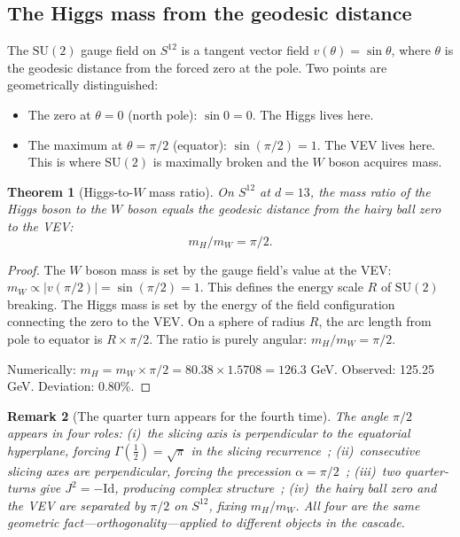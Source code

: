 \documentclass[12pt,a4paper]{article}
\newtheorem{theorem}{Theorem}[section]
\newtheorem{remark}[theorem]{Remark}
\begin{document}
\subsection{The Higgs mass from the geodesic distance}

The $\mathrm{SU}(2)$ gauge field on $S^{12}$ is a tangent vector field $v(\theta)=\sin\theta$,
where $\theta$ is the geodesic distance from the forced zero at the pole. Two points are
geometrically distinguished:
\begin{itemize}
\item The zero at $\theta=0$ (north pole): $\sin 0=0$. The Higgs lives here.
\item The maximum at $\theta=\pi/2$ (equator): $\sin(\pi/2)=1$. The VEV lives here. This
is where $\mathrm{SU}(2)$ is maximally broken and the $W$ boson acquires mass.
\end{itemize}

\begin{theorem}[Higgs-to-$W$ mass ratio]\label{thm:higgs}
On $S^{12}$ at $d=13$, the mass ratio of the Higgs boson to the $W$ boson equals the
geodesic distance from the hairy ball zero to the VEV:
\[
m_H/m_W = \pi/2.
\]
\end{theorem}
\begin{proof}
The $W$ boson mass is set by the gauge field's value at the VEV:
$m_W\propto|v(\pi/2)|=\sin(\pi/2)=1$. This defines the energy scale $R$ of $\mathrm{SU}(2)$
breaking. The Higgs mass is set by the energy of the field configuration connecting the zero
to the VEV. On a sphere of radius $R$, the arc length from pole to equator is $R\times\pi/2$.
The ratio is purely angular: $m_H/m_W=\pi/2$.

Numerically: $m_H=m_W\times\pi/2=80.38\times 1.5708=126.3$ GeV. Observed: 125.25 GeV.
Deviation: 0.80\%.
\end{proof}

\begin{remark}[The quarter turn appears for the fourth time]
The angle $\pi/2$ appears in four roles: (i)~the slicing axis is perpendicular to the
equatorial hyperplane, forcing $\Gamma(\tfrac{1}{2})=\sqrt{\pi}$ in the slicing
recurrence~\cite{part0}; (ii)~consecutive slicing axes are perpendicular, forcing the
precession $\alpha=\pi/2$~\cite{part2}; (iii)~two quarter-turns give $J^2=-\mathrm{Id}$,
producing complex structure~\cite{part2}; (iv)~the hairy ball zero and the VEV are
separated by $\pi/2$ on $S^{12}$, fixing $m_H/m_W$. All four are the same geometric
fact---orthogonality---applied to different objects in the cascade.
\end{remark}
\end{document}
